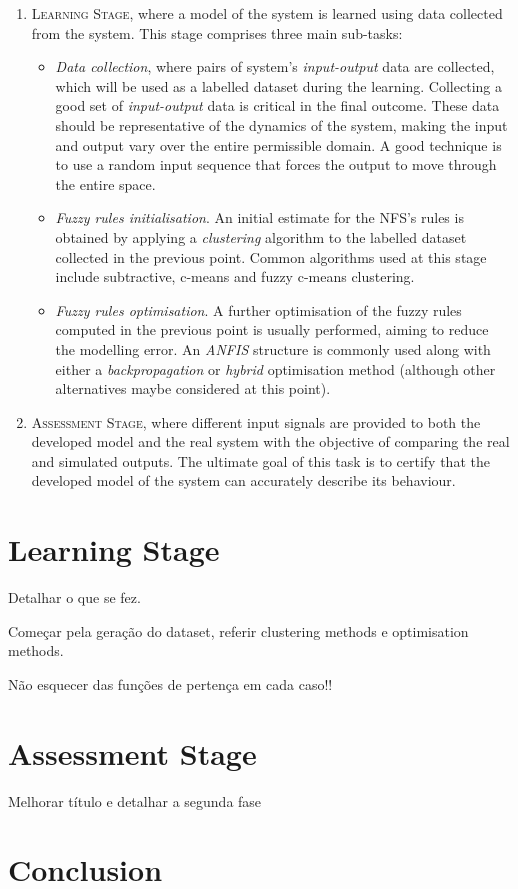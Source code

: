\documentclass[11pt]{article}
\begin{document}
\begin{enumerate}
	\item \textsc{Learning Stage}, where a model of the system is learned using data collected from the system. This stage comprises three main sub-tasks:
	
	\begin{itemize}
		\item \emph{Data collection}, where pairs of system's \emph{input-output} data are collected, which will be used as a labelled dataset during the learning. Collecting a good set of \emph{input-output} data is critical in the final outcome. These data should be representative of the dynamics of the system, making the input and output vary over the entire permissible domain. A good technique is to use a random input sequence that forces the output to move through the entire space.
		
		\item \emph{Fuzzy rules initialisation}. An initial estimate for the NFS's rules is obtained by applying a \emph{clustering} algorithm to the labelled dataset collected in the previous point. Common algorithms used at this stage include subtractive, c-means and fuzzy c-means clustering.
		
		\item \emph{Fuzzy rules optimisation}. A further optimisation of the fuzzy rules computed in the previous point is usually performed, aiming to reduce the modelling error. An \emph{ANFIS} structure is commonly used along with either a \emph{backpropagation} or \emph{hybrid} optimisation method (although other alternatives maybe considered at this point).
		
	\end{itemize}
	
	\item \textsc{Assessment Stage}, where different input signals are provided to both the developed model and the real system with the objective of comparing the real and simulated outputs. The ultimate goal of this task is to certify that the developed model of the system can accurately describe its behaviour.
\end{enumerate}

\section{Learning Stage}
\label{fase_a}

Detalhar o que se fez.

Começar pela geração do dataset, referir clustering methods e optimisation methods.

Não esquecer das funções de pertença em cada caso!!

\section{Assessment Stage}
\label{fase_b}

Melhorar título e detalhar a segunda fase


\section{Conclusion}
\label{conclusion}
\end{document}
